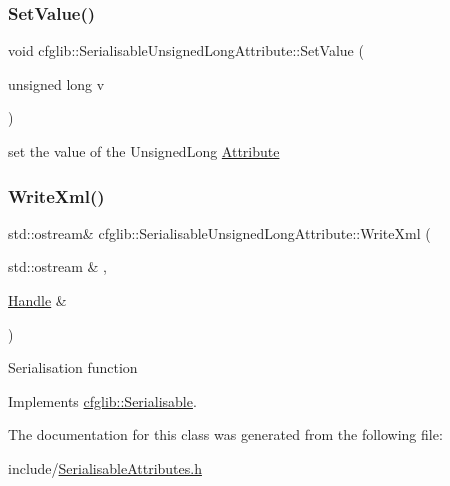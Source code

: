 \subsubsection{\texorpdfstring{Set\+Value()}{SetValue()}}
{\footnotesize\ttfamily void cfglib\+::\+Serialisable\+Unsigned\+Long\+Attribute\+::\+Set\+Value (\begin{DoxyParamCaption}\item[{unsigned long}]{v }\end{DoxyParamCaption})\hspace{0.3cm}{\ttfamily [inline]}}

set the value of the Unsigned\+Long \hyperlink{classcfglib_1_1Attribute}{Attribute} \mbox{\label{classcfglib_1_1SerialisableUnsignedLongAttribute_ad0ffd60cbd393da8b75508c14ab43ce2}} 
\subsubsection{\texorpdfstring{Write\+Xml()}{WriteXml()}}
{\footnotesize\ttfamily std\+::ostream\& cfglib\+::\+Serialisable\+Unsigned\+Long\+Attribute\+::\+Write\+Xml (\begin{DoxyParamCaption}\item[{std\+::ostream \&}]{,  }\item[{\hyperlink{classcfglib_1_1Handle}{Handle} \&}]{ }\end{DoxyParamCaption})\hspace{0.3cm}{\ttfamily [virtual]}}

Serialisation function 

Implements \hyperlink{classcfglib_1_1Serialisable_aaeb80cc7397ad312e5ae34f39412ce42}{cfglib\+::\+Serialisable}.



The documentation for this class was generated from the following file\+:\begin{DoxyCompactItemize}
\item 
include/\hyperlink{SerialisableAttributes_8h}{Serialisable\+Attributes.\+h}\end{DoxyCompactItemize}
